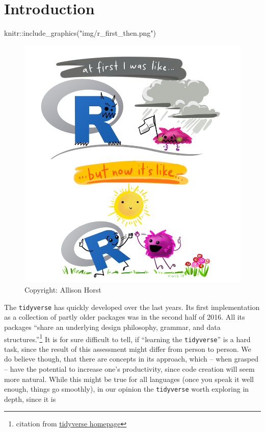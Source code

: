 \documentclass[]{book}
\newenvironment{Shaded}{}{}
\newcommand{\KeywordTok}[1]{\textcolor[rgb]{0.00,0.00,1.00}{#1}}
\newcommand{\NormalTok}[1]{#1}
\newcommand{\OperatorTok}[1]{#1}
\newcommand{\StringTok}[1]{\textcolor[rgb]{0.00,0.50,0.50}{#1}}
\let\rmarkdownfootnote\footnote%
\def\footnote{\protect\rmarkdownfootnote}
\begin{document}
\hypertarget{introduction}{%
\section*{Introduction}\label{introduction}}

\begin{Shaded}
\begin{Highlighting}[]
\NormalTok{knitr}\OperatorTok{::}\KeywordTok{include_graphics}\NormalTok{(}\StringTok{"img/r_first_then.png"}\NormalTok{)}
\end{Highlighting}
\end{Shaded}

\begin{figure}

\hfill{}\includegraphics[width=11.11in]{img/r_first_then} 

\caption{Copyright: Allison Horst}\label{fig:r-first}
\end{figure}

The \texttt{tidyverse} has quickly developed over the last years.
Its first implementation as a collection of partly older packages was in the second half of 2016.
All its packages ``share an underlying design philosophy, grammar, and data structures.''\footnote{citation from \href{https://www.tidyverse.org/}{tidyverse homepage}}
It is for sure difficult to tell, if ``learning the \texttt{tidyverse}'' is a hard task, since the result of this assessment might differ from person to person.
We do believe though, that there are concepts in its approach, which -- when grasped -- have the potential to increase one's productivity, since code creation will seem more natural.
While this might be true for all languages (once you speak it well enough, things go smoothly), in our opinion the \texttt{tidyverse} worth exploring in depth, since it is
\end{document}
